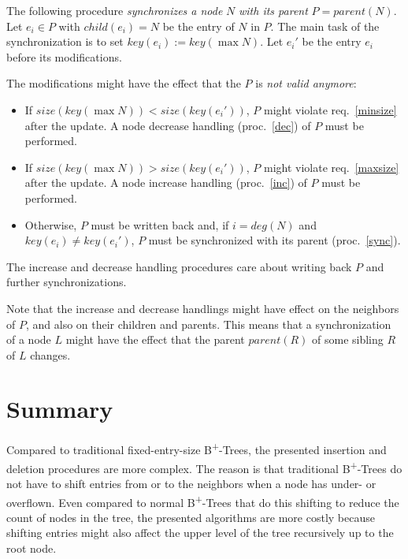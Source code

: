 \documentclass{vldb}
\begin{document}
\begin{proc} \label{sync}
The following procedure {\em synchronizes a node} $N$ {\em with its parent}
$P = parent(N)$.
Let \mbox{$e_i \in P$} with \mbox{$child(e_i) = N$} be the entry of
$N$ in $P$.
The main task of the synchronization is to set \mbox{$key(e_i) := key(\max N)$}.
Let $e_i'$ be the entry $e_i$ before its modifications.

The modifications might have the effect that the $P$ is {\em not valid anymore}:
\begin{itemize}
\item If \mbox{$size(key(\max N)) < size(key(e_i'))$},
    $P$ might violate req.~\ref{minsize} after the update.
    A node decrease handling (proc.~\ref{dec}) of $P$ must be performed.
\item If \mbox{$size(key(\max N)) > size(key(e_i'))$},
    $P$ might violate req.~\ref{maxsize} after the update.
    A node increase handling (proc.~\ref{inc}) of $P$ must be performed.
\item Otherwise, $P$ must be written back and, if $i = deg(N)$ and
    $key(e_i) \neq key(e_i')$, $P$ must be synchronized with its parent
    (proc.~\ref{sync}).
\end{itemize}

The increase and decrease handling procedures care about writing back $P$
and further synchronizations.

Note that the increase and decrease handlings might have effect on the
neighbors of $P$, and also on their children and parents.
This means that a synchronization of a node $L$ might have the effect that
the parent $parent(R)$ of some sibling $R$ of $L$ changes.
\end{proc}



\section{Summary}

Compared to traditional fixed-entry-size B\textsuperscript{+}-Trees, the
presented insertion and deletion procedures are more complex.
The reason is that traditional B\textsuperscript{+}-Trees do not have to shift
entries from or to the neighbors when a node has under- or overflown.
Even compared to normal B\textsuperscript{+}-Trees that do this shifting to
reduce the count of nodes in the tree, the presented algorithms are more
costly because shifting entries might also affect the upper level of the tree
recursively up to the root node.
\end{document}
